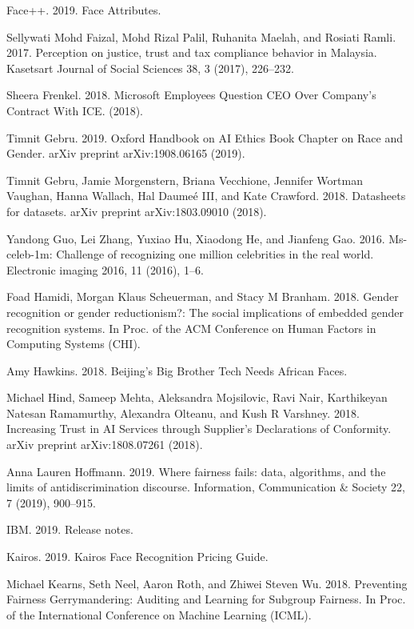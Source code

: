 \documentclass[11pt, a4paper]{article}
\begin{document}
\begin{thebibliography}{9}
    Face++. 2019. Face Attributes.

    Sellywati Mohd Faizal, Mohd Rizal Palil, Ruhanita Maelah, and Rosiati Ramli.
    2017. Perception on justice, trust and tax compliance behavior in Malaysia.
    Kasetsart Journal of Social Sciences 38, 3 (2017), 226–232.

    Sheera Frenkel. 2018. Microsoft Employees Question CEO Over Company’s Contract With ICE. (2018).
    
    Timnit Gebru. 2019. Oxford Handbook on AI Ethics Book Chapter on Race and Gender.
    arXiv preprint arXiv:1908.06165 (2019).
    
    Timnit Gebru, Jamie Morgenstern, Briana Vecchione, Jennifer Wortman Vaughan, Hanna Wallach, Hal Daume\'e III,
    and Kate Crawford. 2018. Datasheets for datasets. arXiv preprint arXiv:1803.09010 (2018).

    Yandong Guo, Lei Zhang, Yuxiao Hu, Xiaodong He, and Jianfeng Gao. 2016.
    Ms-celeb-1m: Challenge of recognizing one million celebrities in the real world.
    Electronic imaging 2016, 11 (2016), 1–6.

    Foad Hamidi, Morgan Klaus Scheuerman, and Stacy M Branham. 2018. Gender
    recognition or gender reductionism?: The social implications of embedded gender recognition systems.
    In Proc. of the ACM Conference on Human Factors in Computing Systems (CHI).

    Amy Hawkins. 2018. Beijing's Big Brother Tech Needs African Faces.

    Michael Hind, Sameep Mehta, Aleksandra Mojsilovic, Ravi Nair,
    Karthikeyan Natesan Ramamurthy, Alexandra Olteanu, and Kush R Varshney.
    2018. Increasing Trust in AI Services through Supplier’s Declarations of
    Conformity. arXiv preprint arXiv:1808.07261 (2018).

    Anna Lauren Hoffmann. 2019. Where fairness fails: data, algorithms, and the
    limits of antidiscrimination discourse. Information, Communication \& Society 22,
    7 (2019), 900–915.

    IBM. 2019. Release notes.

    Kairos. 2019. Kairos Face Recognition Pricing Guide.

    Michael Kearns, Seth Neel, Aaron Roth, and Zhiwei Steven Wu. 2018. Preventing
    Fairness Gerrymandering: Auditing and Learning for Subgroup Fairness. In Proc.
    of the International Conference on Machine Learning (ICML).


\end{thebibliography}
\end{document}

